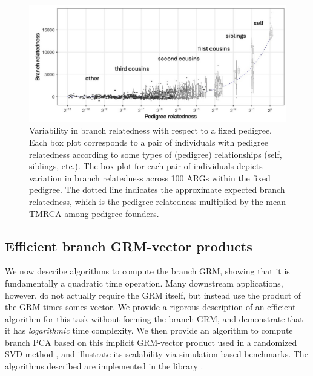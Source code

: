\begin{figure}
    \centering
    \includegraphics[width=\textwidth]{Figures/Fig5_branch_recap_sim_boxplot_combined_behind2.jpg}
    \caption{Variability in branch relatedness with respect to a fixed pedigree.
    Each box plot corresponds to a pair of individuals with pedigree relatedness
    according to some types of (pedigree) relationships (self, siblings, etc.).
    The box plot for each pair of individuals depicts variation in branch relatedness across 100 ARGs within the fixed pedigree.
    The dotted line indicates the approximate expected branch relatedness,
    which is the pedigree relatedness multiplied by the mean TMRCA among pedigree founders.}
    \label{fig:boxplots}
\end{figure}



% 


\subsection{Efficient branch GRM-vector products}\label{subsec:matvec}
We now describe algorithms to compute the branch GRM, showing that it is 
fundamentally a quadratic time operation. Many downstream applications, however,
do not actually require the GRM itself, but instead use the product of the 
GRM times somes vector. We provide a rigorous description of an efficient 
algorithm for this task without forming the branch GRM,
and demonstrate that it has \emph{logarithmic} time complexity.
We then provide an algorithm to compute branch PCA based on this implicit GRM-vector
product used in a randomized SVD method \citep{halko2011findingstructure},
and illustrate its scalability
via simulation-based benchmarks.
The algorithms described are implemented in
the \tskit{} library \citep{ralph2020efficiently, kelleher2024tskit}.


